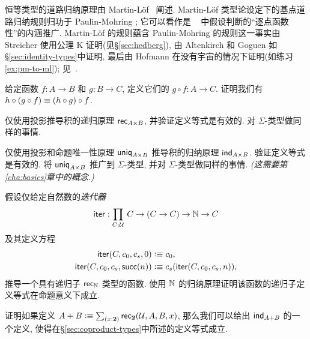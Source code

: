 恒等类型的道路归纳原理由 Martin-L\"{o}f~\cite{Martin-Lof-1973} 阐述.
Martin-L\"of 类型论设定下的基点道路归纳规则归功于 Paulin-Mohring \cite{Moh93}; 
它可以看作是 \NuPRL~\cite[Section~8.1]{constable+86nuprl-book} 中假设判断的``逐点函数性''的内涵推广. 
Martin-L\"of 的规则蕴含 Paulin-Mohring 的规则这一事实由 Streicher 使用公理 K 证明(见\S\ref{sec:hedberg}), 由 Altenkirch 和 Goguen 如\S\ref{sec:identity-types}中证明,
最后由 Hofmann 在没有宇宙的情况下证明(如练习\ref{ex:pm-to-ml}); 见~\cite[\S1.3 and Addendum]{Streicher93}.

\sectionExercises

\begin{ex}\label{ex:composition}
  给定函数 $f:A\to B$ 和 $g:B\to C$, 定义它们的
 $g\circ f:A\to C$.
  证明我们有 $h \circ (g\circ f) \equiv (h\circ g)\circ f$.
\end{ex}

\begin{ex}\label{ex:pr-to-rec}
  仅使用投影推导积的递归原理 $\mathsf{rec}_{A\times B}$, 并验证定义等式是有效的.
  对 $\Sigma$-类型做同样的事情.
\end{ex}

\begin{ex}\label{ex:pr-to-ind}
  仅使用投影和命题唯一性原理 $\mathsf{uniq}_{A\times B}$ 推导积的归纳原理 $\mathsf{ind}_{A\times B}$.
  验证定义等式是有效的.
  将 $\mathsf{uniq}_{A\times B}$ 推广到 $\Sigma$-类型, 并对 $\Sigma$-类型做同样的事情.
  \emph{(这需要第\ref{cha:basics}章中的概念.)}
\end{ex}

\begin{ex}\label{ex:iterator}
假设仅给定自然数的\emph{迭代器}
\[\ite : \prd{C:\UU} C \to (C \to C) \to \nat \to C \]
及其定义方程
\begin{align*}
\mathsf{iter}(C,c_0,c_s,0)  &\vcentcolon\equiv c_0, \\
\mathsf{iter}(C,c_0,c_s,\mathsf{succ}(n)) &\vcentcolon\equiv c_s(\mathsf{iter}(C,c_0,c_s,n)),
\end{align*}
推导一个具有递归子 $\mathsf{rec}_{\mathbb{N}}$ 类型的函数.
使用 $\mathbb{N}$ 的归纳原理证明该函数的递归子定义等式在命题意义下成立.
\end{ex}

\begin{ex}\label{ex:sum-via-bool}
%
证明如果定义 $A + B \defeq \sm{x:\bool} \rec{\bool}(\UU,A,B,x)$, 那么我们可以给出 $\mathsf{ind}_{A+B}$ 的一个定义, 使得在\S\ref{sec:coproduct-types}中所述的定义等式成立.
\end{ex}

